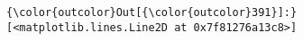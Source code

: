 \documentclass[11pt]{article}
\begin{document}
\begin{Verbatim}[commandchars=\\\{\}]
{\color{outcolor}Out[{\color{outcolor}391}]:} [<matplotlib.lines.Line2D at 0x7f81276a13c8>]
\end{Verbatim}
            
    \begin{center}
    \end{center}
    { \hspace*{\fill} \\}
    

    
    
    
    
\end{document}
